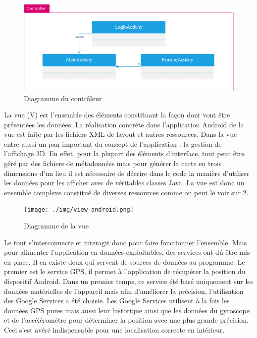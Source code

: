         \begin{figure}[H]
            \centering
            \includegraphics{./img/android-controller.png}
            \caption{Diagramme du contrôleur}
            \label{controller}
        \end{figure}


        La vue (V) est l’ensemble des éléments constituant la façon dont vont être présentées les données. La réalisation concrète dans l’application Android de la vue est faite par les fichiers XML de layout et autres ressources. Dans la vue entre aussi un pan important du concept de l’application : la gestion de l’affichage 3D. En effet, pour la plupart des éléments d’interface, tout peut être géré par des fichiers de métadonnées mais pour générer la carte en trois dimensions d’un lieu il est nécessaire de décrire dans le code la manière d’utiliser les données pour les afficher avec de véritables classes Java. La vue est donc un ensemble complexe constitué de diverses ressources comme on peut le voir sur \ref{view}.

        \begin{figure}[H]
            \centering
            \texttt{[image: ./img/view-android.png]}
            \caption{Diagramme de la vue}
            \label{view}
        \end{figure}

        Le tout s’interconnecte et interagit donc pour faire fonctionner l’ensemble. Mais pour alimenter l’application en données exploitables, des services ont dû être mis en place. Il en existe deux qui servent de sources de données au programme. Le premier est le service GPS, il permet à l’application de récupérer la position du dispositif Android. Dans un premier temps, ce service été basé uniquement sur les données matérielles de l’appareil mais afin d’améliorer la précision, l’utilisation des Google Services a été choisie. Les Google Services utilisent à la fois les données GPS pures mais aussi leur historique ainsi que les données du gyroscope et de l’accéléromètre pour déterminer la position avec une plus grande précision. Ceci s’est avéré indispensable pour une localisation correcte en intérieur.

